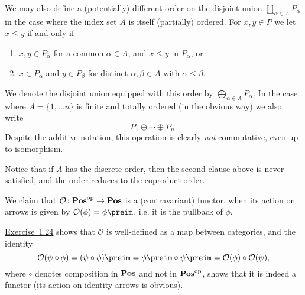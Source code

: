 \documentclass[article, a4paper, 11pt, oneside]{memoir}
\numberwithin{equation}{chapter}
\newcommand{\RNum}[1]{\uppercase\expandafter{\romannumeral #1\relax}}
\newcommand{\exref}[1]{%
    \hyperref[ex:#1]{Exercise~#1}%
}
\theoremstyle{nonumberplain}
\let\bigcoprod\coprod
\renewcommand{\coprod}{\sqcup}
\begin{document}
\begin{remarkbreak}
    We may also define a (potentially) different order on the disjoint union $\bigcoprod_{\alpha \in A} P_\alpha$ in the case where the index set $A$ is itself (partially) ordered. For $x,y \in P$ we let $x \leq y$ if and only if
    \begin{enumerate}
        \item $x,y \in P_\alpha$ for a common $\alpha \in A$, and $x \leq y$ in $P_\alpha$, or
        \item $x \in P_\alpha$ and $y \in P_\beta$ for distinct $\alpha,\beta \in A$ with $\alpha \leq \beta$.
    \end{enumerate}
    We denote the disjoint union equipped with this order by $\bigoplus_{\alpha \in A} P_\alpha$. In the case where $A = \{1, \ldots n\}$ is finite and totally ordered (in the obvious way) we also write
    \begin{equation*}
        P_1 \oplus \cdots \oplus P_n.
    \end{equation*}
    Despite the additive notation, this operation is clearly \emph{not} commutative, even up to isomorphism.

    Notice that if $A$ has the discrete order, then the second clause above is never satisfied, and the order reduces to the coproduct order.
\end{remarkbreak}

\newcommand{\downsets}{\mathcal{O}}
\newcommand{\op}{^{\mathrm{op}}}

\begin{remarkbreak}[The functor $\downsets$]
    We claim that $\mathcal{O} \colon \catPos\op \to \catPos$ is a (contravariant) functor, when its action on arrows is given by $\mathcal{O}(\phi) = \phi\preim$, i.e. it is the pullback of $\phi$.

    \exref{1.24} shows that $\mathcal{O}$ is well-defined as a map between categories, and the identity
    \begin{equation*}
        \mathcal{O}(\psi \circ \phi)
            = (\psi \circ \phi)\preim
            = \phi\preim \circ \psi\preim
            = \mathcal{O}(\phi) \circ \mathcal{O}(\psi),
    \end{equation*}
    where $\circ$ denotes composition in $\mathbf{Pos}$ and not in $\catPos\op$, shows that it is indeed a functor (its action on identity arrows is obvious).
\end{remarkbreak}
\end{document}
